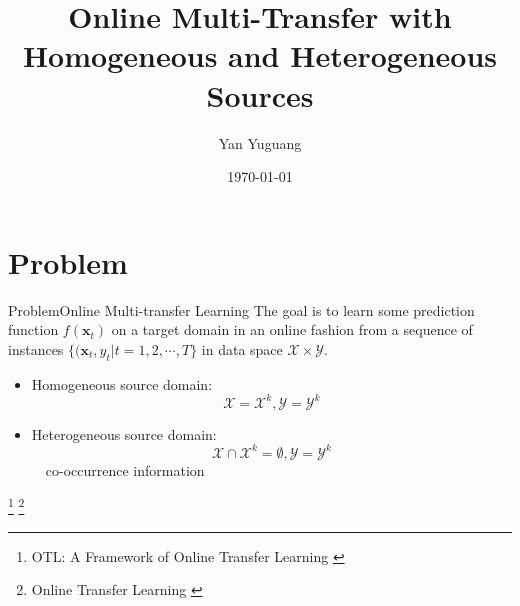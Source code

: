 \documentclass{beamer}
\begin{document}
\title[OMT]{Online Multi-Transfer with Homogeneous and Heterogeneous Sources}
\author[yanyg]{Yan Yuguang}
\date{\today}
\subject{Online Multi-transfer}


\maketitle


\section{Problem}
\begin{frame}{Problem}{Online Multi-transfer Learning}
The goal is to learn some prediction function $f(\mathbf{x}_t)$ on a target domain in an online fashion from a sequence of instances $\{(\mathbf{x}_t, y_t | t = 1, 2, \cdots, T\}$ in data space $\mathcal{X} \times \mathcal{Y}$.
\\
\begin{itemize}
\item
Homogeneous source domain: 
\\
$$\mathcal{X} = \mathcal{X}^k, \mathcal{Y} = \mathcal{Y}^k$$
\item
Heterogeneous source domain: 
\\
$$\mathcal{X} \cap \mathcal{X}^k = \emptyset, \mathcal{Y} = \mathcal{Y}^k$$
~~co-occurrence information \cite{ng2012co}
\end{itemize}
\begin{footnotesize}
\footnote{OTL: A Framework of Online Transfer Learning \cite{zhao2010otl}}
\footnote{Online Transfer Learning \cite{zhao2014online}}
\end{footnotesize}
\end{frame}
\end{document}
